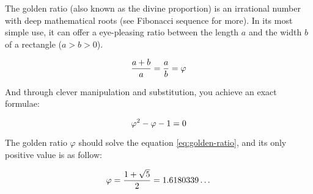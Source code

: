 \begin{note}
  The golden ratio (also known as the divine proportion) is an irrational number with deep mathematical roots (see Fibonacci sequence for more). In its most simple use, it can offer a eye-pleasing ratio between the length $a$ and the width $b$ of a rectangle ($a > b > 0$).

  \begin{equation}
    \centering
    \frac{a + b}{a} = \frac{a}{b}=\varphi
  \end{equation}

  And through clever manipulation and substitution, you achieve an exact formulae:

  \begin{equation}
    \centering
    \label{eq:golden-ratio}
    \varphi^2 - \varphi - 1 = 0
  \end{equation}

  The golden ratio $\varphi$ should solve the equation \ref{eq:golden-ratio}, and its only positive value is as follow:

  \begin{equation}
    \centering
    \varphi = \frac{1 + \sqrt{5}}{2} = 1.6180339\dots
  \end{equation}
\end{note}
